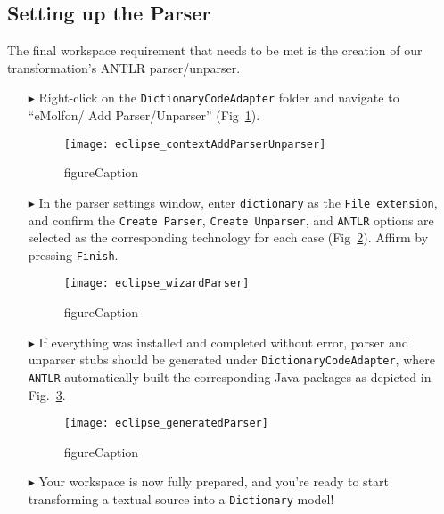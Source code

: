 \newpage
\hypertarget{subSec:setupParser}{}
\subsection{Setting up the Parser}
\genHeader

The final workspace requirement that needs to be met is the creation of our transformation's ANTLR parser/unparser.
\begin{itemize}

\item[$\blacktriangleright$] Right-click on the \texttt{DictionaryCodeAdapter} folder and navigate to ``eMolfon/ Add Parser/Unparser''
(Fig~\ref{eclipse:contextParser}).

\vspace{0.5cm}

\begin{figure}[htpb]
\begin{center}
  \texttt{[image: eclipse\_contextAddParserUnparser]}
  \caption{figureCaption}
  \label{eclipse:contextParser}
\end{center}
\end{figure}


\item[$\blacktriangleright$] In the parser settings window, enter \texttt{dictionary} as the \texttt{File extension}, and confirm the \texttt{Create Parser},
\texttt{Create Unparser}, and \texttt{ANTLR} options are selected as the corresponding technology for each case (Fig~\ref{eclipse:wizardParser}). Affirm by
pressing \texttt{Finish}.

\begin{figure}[htpb]
\begin{center}
  \texttt{[image: eclipse\_wizardParser]}
  \caption{figureCaption}
  \label{eclipse:wizardParser}
\end{center}
\end{figure}

\vspace{0.5cm}

\item[$\blacktriangleright$] If everything was installed and completed without error, parser and unparser stubs should be generated under
\texttt{DictionaryCodeAdapter}, where \texttt{ANTLR} automatically built the corresponding Java packages as depicted in Fig.~\ref{eclipse:generatedParser}.

\begin{figure}[htpb]
\begin{center}
  \texttt{[image: eclipse\_generatedParser]}
  \caption{figureCaption}
  \label{eclipse:generatedParser}
\end{center}
\end{figure}

\vspace{0.5cm}

\item[$\blacktriangleright$] Your workspace is now fully prepared, and you're ready to start transforming a textual source into a \texttt{Dictionary}
model!

\end{itemize}

